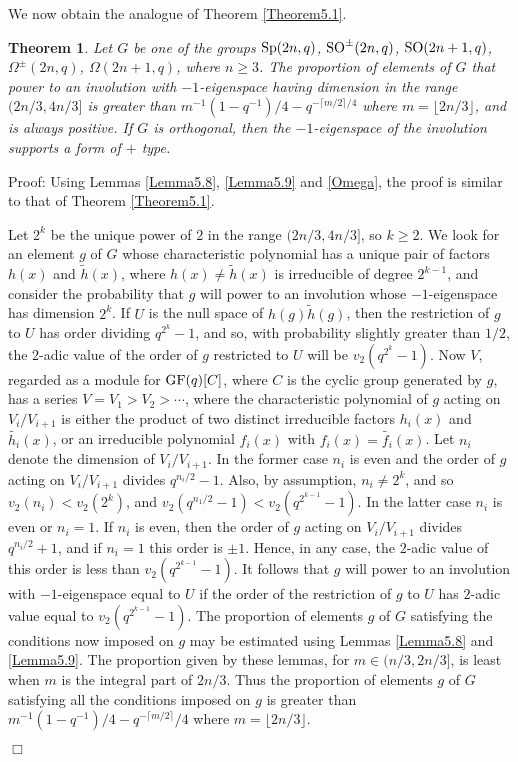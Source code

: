 \documentclass[12pt]{article}
\newtheorem{theorem}[definition]{Theorem}
\newenvironment{proof}{\normalsize {\sc Proof}:}{{\hfill $\Box$ \\}}
\def\SO{{\rm SO}}
\def\SP{{\rm Sp}}
\def\Oh{O}  %
\def\GF{{\rm GF}}
\begin{document}
We now obtain the analogue of Theorem \ref{Theorem5.1}.
\begin{theorem}\label{Theorem5.2}  Let $G$ be one of the 
groups $\SP(2n,q)$, $\SO^{\pm}(2n,q)$, $\SO(2n+1,q)$,
$\Omega^{\pm}(2n,q)$, $\Omega(2n+1,q)$, where $n\ge 3$.
The proportion of elements of $G$ that power to an 
involution with $-1$-eigenspace having dimension
in the range $(2n/3,4n/3]$ is greater than
$m^{-1} (1 - q^{-1}) / 4 - q^{-\lceil m/2 \rceil /4}$
where $m = \lfloor 2n / 3 \rfloor$, and is always positive.
If $G$ is orthogonal, then the $-1$-eigenspace of the 
involution supports a form of $+$ type.
\end{theorem}
\begin{proof} 
Using Lemmas \ref{Lemma5.8}, \ref{Lemma5.9} and \ref{Omega}, 
the proof is similar to that of Theorem \ref{Theorem5.1}.   

Let $2^k$ be the unique power of $2$ in the range $(2n/3,4n/3]$, 
so $k\ge2$. We look for an element $g$ of $G$ whose characteristic
polynomial has a unique pair of factors $h(x)$ and $\tilde{h}(x)$, 
where $h(x)\ne\tilde{h}(x)$ is irreducible of degree $2^{k-1}$, and
consider the probability that $g$ will power to an involution whose 
$-1$-eigenspace has
dimension $2^k$.  If $U$ is the null space of $h(g)\tilde{h}(g)$,
then the restriction of $g$ to $U$ has order 
dividing $q^{2^k}-1$, and so, with probability slightly greater than 
$1/2$, the $2$-adic value of the order of $g$
restricted to $U$ will be $v_2(q^{2^k}-1)$.  Now $V$, regarded as a 
module for $\GF(q)[C]$, where $C$ is the cyclic group generated
by $g$, has a series $V=V_1>V_2>\cdots$, where the characteristic polynomial 
of $g$ acting on $V_i/V_{i+1}$ is either
the product of two distinct irreducible factors $h_i(x)$ and $\tilde{h_i}(x)$,
or an irreducible polynomial $f_i(x)$ with $f_i(x)=\tilde{f_i}(x)$. 
Let $n_i$ denote the dimension of  $V_i/V_{i+1}$.  In the former 
case $n_i$ is even and the order of $g$ acting on 
$V_i/V_{i+1}$ divides $q^{n_i/2}-1$.
Also, by assumption, $n_i\ne 2^k$, and so $v_2(n_i)<v_2(2^k)$, and 
$v_2(q^{n_1/2}-1)<v_2(q^{2^{k-1}}-1)$.  In the latter case $n_i$ is even
or $n_i=1$.  If $n_i$ is even, then the order of $g$ acting 
on $V_i/V_{i+1}$ divides $q^{n_i/2}+1$, and 
if $n_i=1$ this order is $\pm1$.  
Hence, in any case, the $2$-adic value of this order is 
less than $v_2(q^{2^{k-1}}-1)$.  It follows that $g$ will power 
to an involution with $-1$-eigenspace equal to $U$ if the order of 
the restriction of $g$ to $U$ has $2$-adic value equal to 
$v_2(q^{2^{k-1}}-1)$.  The proportion
of elements $g$ of $G$ satisfying the conditions now imposed 
on $g$ may be estimated using Lemmas \ref {Lemma5.8} and
\ref{Lemma5.9}.  The proportion given by these lemmas, 
for $m\in(n/3,2n/3]$, is least when $m$ is the 
integral part of $2n/3$.
Thus the proportion of elements $g$ of $G$ satisfying all the 
conditions imposed on $g$ is greater 
than $m^{-1}(1-q^{-1})/4-q^{-\lceil m/2\rceil}/4$
where $m=\lfloor 2n/3\rfloor$.


\end{proof}
\end{document}
